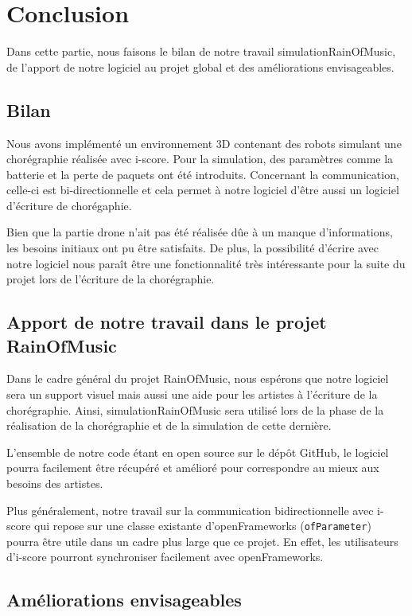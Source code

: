 \section{Conclusion}

Dans cette partie, nous faisons le bilan de notre travail simulationRainOfMusic, de l'apport de notre logiciel au projet global et des améliorations envisageables.

\subsection{Bilan}

Nous avons implémenté un environnement 3D contenant des robots simulant une chorégraphie réalisée avec i-score. Pour la simulation, des paramètres comme la batterie et la perte de paquets ont été introduits. Concernant la communication, celle-ci est bi-directionnelle et cela permet à notre logiciel d'être aussi un logiciel d'écriture de chorégaphie. 

Bien que la partie drone n'ait pas été réalisée dûe à un manque d'informations, les besoins initiaux ont pu être satisfaits. De plus, la possibilité d'écrire avec notre logiciel nous paraît être une fonctionnalité très intéressante pour la suite du projet lors de l'écriture de la chorégraphie.

\subsection{Apport de notre travail dans le projet RainOfMusic}

Dans le cadre général du projet RainOfMusic, nous espérons que notre logiciel sera un support visuel mais aussi une aide pour les artistes à l'écriture de la chorégraphie. Ainsi, simulationRainOfMusic sera utilisé lors de la phase de la réalisation de la chorégraphie et de la simulation de cette dernière. 

L'ensemble de notre code étant en open source sur le dépôt GitHub, le logiciel pourra facilement être récupéré et amélioré pour correspondre au mieux aux besoins des artistes. 

Plus généralement, notre travail sur la communication bidirectionnelle avec i-score qui repose sur une classe existante d'openFrameworks (\verb|ofParameter|) pourra être utile dans un cadre plus large que ce projet. En effet, les utilisateurs d'i-score pourront synchroniser facilement avec openFrameworks.

\subsection{Améliorations envisageables}

